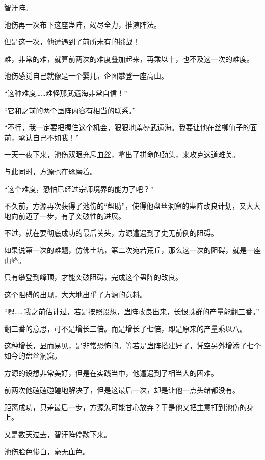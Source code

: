 
\begin{this_body}



智汗阵。

池伤再一次布下这座蛊阵，竭尽全力，推演阵法。

但是这一次，他遭遇到了前所未有的挑战！

难，非常的难，就算前两次的难度叠加起来，再乘以十，也不及这一次的难度。

池伤感觉自己就像是一个婴儿，企图攀登一座高山。

“这种难度……难怪那武遗海非常自信！”

“它和之前的两个蛊阵内容有相当的联系。”

“不行，我一定要把握住这个机会，狠狠地羞辱武遗海。我要让他在丝柳仙子的面前，承认自己不如我！”

一天一夜下来，池伤双眼充斥血丝，拿出了拼命的劲头，来攻克这道难关。

与此同时，方源也在琢磨着。

“这个难度，恐怕已经过宗师境界的能力了吧？”

不久前，方源再次获得了池伤的“帮助”，使得他盘丝洞窟的蛊阵改良计划，又大大地向前迈了一步，有了突破性的进展。

不过，就在要彻底成功的最后关头，方源遭遇到了史无前例的阻碍。

如果说第一次的难题，仿佛土坑，第二次宛若荒丘，那么这一次的阻碍，就是一座山峰。

只有攀登到峰顶，才能突破阻碍，完成这个蛊阵的改良。

这个阻碍的出现，大大地出乎了方源的意料。

“嗯……我之前估计过，若是按照设想，蛊阵改良出来，长恨蛛群的产量能翻三番。”

翻三番的意思，可不是增长三倍。而是增长了七倍，即是原来的产量乘以八。

这种增长，显而易见，是非常恐怖的。等若是蛊阵搭建好了，凭空另外增添了七个如今的盘丝洞窟。

方源的设想非常美好，但是在实践当中，他遭遇到了相当大的困难。

前两次他磕磕碰碰地解决了，但是这最后一次，却是让他一点头绪都没有。

距离成功，只差最后一步，方源怎可能甘心放弃？于是他又把主意打到池伤的身上。

又是数天过去，智汗阵停歇下来。

池伤脸色惨白，毫无血色。


\end{this_body}
